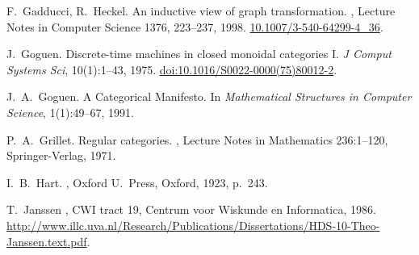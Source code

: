 \begin{thebibliography}{RSW00}
    F.\ Gadducci, R.\ Heckel.
    \newblock An inductive view of graph transformation.
    , Lecture
    Notes in Computer Science 1376, 223--237, 1998.
    \newblock \href{http://doi.org/10.1007/3-540-64299-4_36}{
    10.1007/3-540-64299-4\_36}.

    J.\ Goguen.
    \newblock Discrete-time machines in closed monoidal categories I.
    \newblock \emph{J Comput Systems Sci}, 10(1):1--43, 1975.
    \newblock
    \href{http://doi.org/10.1016/S0022-0000(75)80012-2}{doi:10.1016/S0022-0000(75)80012-2}.

    J.\ A.\ Goguen. 
    \newblock A Categorical Manifesto. 
    \newblock In {\em Mathematical Structures in Computer Science}, 1(1):49--67,
    1991.


    P.\ A.\ Grillet.
    \newblock Regular categories.
    , Lecture Notes in
    Mathematics 236:1--120, Springer-Verlag, 1971.


    I.\ B.\ Hart.
    , Oxford U.\ Press, Oxford, 1923, p.\ 243.

    
    
    T.\ Janssen
    , CWI tract 19, Centrum voor
    Wiskunde en Informatica, 1986.
    \newblock
    \href{http://www.illc.uva.nl/Research/Publications/Dissertations/HDS-10-Theo-Janssen.text.pdf}{http://www.illc.uva.nl/Research/Publications/Dissertations/HDS-10-Theo-Janssen.text.pdf}.
    

\end{thebibliography}
